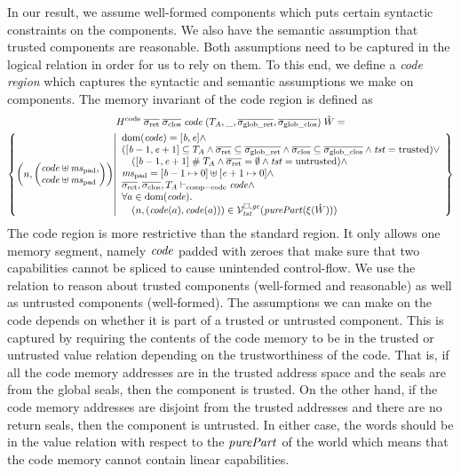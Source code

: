 \begin{jversion}
In our result, we assume well-formed components which puts certain syntactic constraints on the components.
We also have the semantic assumption that trusted components are reasonable.
Both assumptions need to be captured in the logical relation in order for us to rely on them.
To this end, we define a \emph{code region} which captures the syntactic and semantic assumptions we make on components.
The memory invariant of the code region is defined as
\begin{multline*}
  H^\mathrm{code} \; \sigrets \; \sigcloss \; \code \; (\ta,\_,\gsigrets,\gsigcloss) \; \hat{W} =\\
  \left\{\npair{\arraycolsep=0pt\left(\array{l}\code \uplus \mspad,\\ \code \uplus \mspad\endarray\right)} \middle|
    \begin{array}{l}
    \dom(\code) = [\baddr,\eaddr] \wedge \\
      ([\baddr - 1, \eaddr + 1] \subseteq \ta \wedge \sigrets \subseteq \gsigrets \wedge \sigcloss \subseteq \gsigcloss \wedge \trust = \trusted) \vee \\
      \quad ([\baddr-1,\eaddr+1]\mathrel{\#} \ta \wedge \sigrets = \emptyset \wedge \trust =\untrusted) \wedge \\
      \mspad = [\baddr-1 \mapsto 0] \uplus [\eaddr + 1 \mapsto 0]\wedge\\
      \sigrets,\sigcloss,\ta \vdash_{\mathrm{comp-code}} \code \wedge\\
      \forall a \in \dom(\code)\ldotp\\
      \quad\npair{(\code(a),\code(a))} \in \lrvg{\trust}(\purePart{\xi(\hat{W})})
    \end{array}
  \right\}
\end{multline*}
The code region is more restrictive than the standard region.
It only allows one memory segment, namely $\mathit{code}$ padded with zeroes that make sure that two capabilities cannot be spliced to cause unintended control-flow.
We use the relation to reason about trusted components (well-formed and reasonable) as well as untrusted components (well-formed).
The assumptions we can make on the code depends on whether it is part of a trusted or untrusted component.
This is captured by requiring the contents of the code memory to be in the trusted or untrusted value relation depending on the trustworthiness of the code.
That is, if all the code memory addresses are in the trusted address space and the seals are from the global seals, then the component is trusted.
On the other hand, if the code memory addresses are disjoint from the trusted addresses and there are no return seals, then the component is untrusted.
In either case, the words should be in the value relation with respect to the $\purePart{}$ of the world which means that the code memory cannot contain linear capabilities.


\end{jversion}
